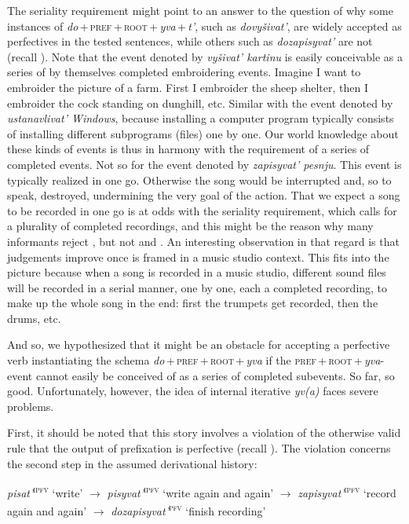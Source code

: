 \documentclass[output=paper,
colorlinks,
citecolor=brown,
newtxmath
]{langscibook}
\begin{document}
The seriality requirement might point to an answer to the question of why some instances of \textit{do}\,+\,\textsc{pref}\,+\,\textsc{root}\,+\,\textit{yva}\,+\,\textit{t'}, such as \textit{dovyšivat'}, are widely accepted as perfectives in the tested sentences, while others such as \textit{dozapisyvat'} are not (recall ). Note that the event denoted by \textit{vyšivat' kartinu} is easily conceivable as a series of by themselves completed embroidering events. Imagine I want to embroider the picture of a farm. First I embroider the sheep shelter, then I embroider the cock standing on dunghill, etc. Similar with the event denoted by \textit{ustanavlivat' Windows}, because installing a computer program typically consists of installing different subprograms (files) one by one. Our world knowledge about these kinds of events is thus in harmony with the requirement of a series of completed events. Not so for the event denoted by \textit{zapisyvat' pesnju}. This event is typically realized in one go. Otherwise the song would be interrupted and, so to speak, destroyed, undermining the very goal of the action. That we expect a song to be recorded in one go is at odds with the seriality requirement, which calls for a plurality of completed recordings, and this might be the reason why many informants reject , but not  and . An interesting observation in that regard is that judgements improve once  is framed in a music studio context. This fits into the picture because when a song is recorded in a music studio, different sound files will be recorded in a serial manner, one by one, each a completed recording, to make up the whole song in the end: first the trumpets get recorded, then the drums, etc.

And so, we hypothesized that it might be an obstacle for accepting a perfective verb instantiating the schema \textit{do}\,+\,\textsc{pref}\,+\,\textsc{root}\,+\,\textit{yva} if the \textsc{pref}\,+\,\textsc{root}\,+\,\textit{yva}-event cannot easily be conceived of as a series of completed subevents. So far, so good. Unfortunately, however, the idea of internal iterative \textit{yv(a)} faces severe problems.

First, it should be noted that this story involves a violation of the otherwise valid rule that the output of prefixation is perfective (recall ). The violation concerns the second step in the assumed derivational history:\largerpage

\ea\label{dhx}
\textit{pisat'}\textsuperscript{\textsc{ipfv}} `write' $\rightarrow$ \textit{pisyvat'}\textsuperscript{\textsc{ipfv}}  `write again and again' $\rightarrow$ \textit{zapisyvat'}\textsuperscript{\textsc{ipfv}} `record again and again' $\rightarrow$ \textit{dozapisyvat'}\textsuperscript{\textsc{pfv}} `finish recording'
\z
\end{document}
